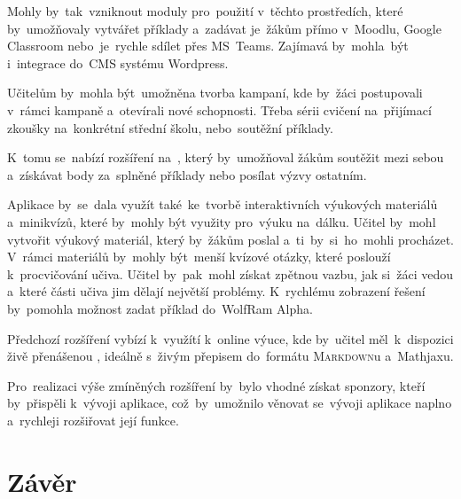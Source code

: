 \documentclass[14pt,a4paper]{article}
\begin{document}
        Mohly by~tak~vzniknout moduly pro~použití v~těchto prostředích, které by~umožňovaly vytvářet příklady a~zadávat je~žákům přímo v~Moodlu, Google Classroom nebo~je~rychle sdílet přes MS~Teams. Zajímavá by~mohla~být i~integrace do~\textsc{CMS} systému Wordpress.

        Učitelům by~mohla být~umožněna tvorba kampaní, kde by~žáci postupovali v~rámci kampaně a~otevírali nové schopnosti. Třeba sérii cvičení na~přijímací zkoušky na~konkrétní střední školu, nebo~soutěžní příklady.
        
        K~tomu se~nabízí rozšíření na~, který by~umožňoval žákům soutěžit mezi sebou a~získávat body za~splněné příklady nebo posílat výzvy ostatním.

        Aplikace by~se~dala využít také~ke~tvorbě interaktivních výukových materiálů a~minikvízů, které by~mohly být využity pro~výuku na~dálku. Učitel by~mohl vytvořit výukový materiál, který by~žákům poslal a~ti~by~si~ho~mohli procházet. V~rámci materiálů by~mohly být~menší kvízové otázky, které poslouží k~procvičování učiva. Učitel by~pak~mohl získat zpětnou vazbu, jak si~žáci vedou a~které části učiva jim dělají největší problémy. K~rychlému zobrazení řešení by~pomohla možnost zadat příklad do~WolfRam Alpha. 
        
        Předchozí rozšíření vybízí k~využítí k~online výuce, kde by~učitel měl~k~dispozici živě přenášenou , ideálně s~živým přepisem do~formátu \textsc{Markdown}u a~Mathjaxu.

        Pro~realizaci výše zmíněných rozšíření by~bylo vhodné získat sponzory, kteří by~přispěli k~vývoji aplikace, což~by~umožnilo věnovat se~vývoji aplikace naplno a~rychleji rozšiřovat její funkce.
	
	\section{Závěr}

    \newpage
    \printbibliography
\end{document}
